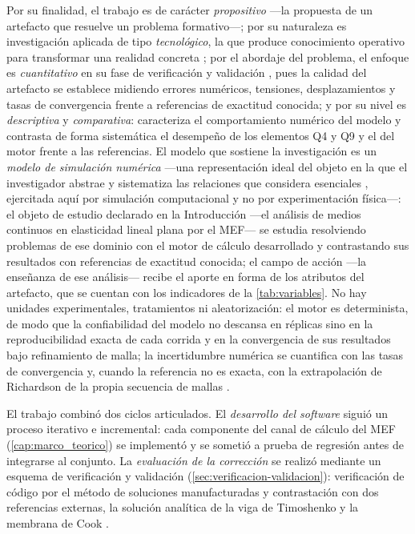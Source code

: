 Por su finalidad, el trabajo es de carácter \emph{propositivo} —la propuesta de un artefacto que resuelve un problema formativo—; por su naturaleza es investigación aplicada de tipo \emph{tecnológico}, la que produce conocimiento operativo para transformar una realidad concreta \autocite[pp.~90-92]{garciacordoba2005tecnologica}; por el abordaje del problema, el enfoque es \emph{cuantitativo} en su fase de verificación y validación \autocite[p.~6]{sampieri2018metodologia}, pues la calidad del artefacto se establece midiendo errores numéricos, tensiones, desplazamientos y tasas de convergencia frente a referencias de exactitud conocida; y por su nivel es \emph{descriptiva} y \emph{comparativa}: caracteriza el comportamiento numérico del modelo y contrasta de forma sistemática el desempeño de los elementos Q4 y Q9 y el del motor frente a las referencias. El modelo que sostiene la investigación es un \emph{modelo de simulación numérica} —una representación ideal del objeto en la que el investigador abstrae y sistematiza las relaciones que considera esenciales \autocite[p.~21]{alvarez_metodologia}, ejercitada aquí por simulación computacional y no por experimentación física—: el objeto de estudio declarado en la Introducción —el análisis de medios continuos en elasticidad lineal plana por el MEF— se estudia resolviendo problemas de ese dominio con el motor de cálculo desarrollado y contrastando sus resultados con referencias de exactitud conocida; el campo de acción —la enseñanza de ese análisis— recibe el aporte en forma de los atributos del artefacto, que se cuentan con los indicadores de la \autoref{tab:variables}. No hay unidades experimentales, tratamientos ni aleatorización: el motor es determinista, de modo que la confiabilidad del modelo no descansa en réplicas sino en la reproducibilidad exacta de cada corrida y en la convergencia de sus resultados bajo refinamiento de malla; la incertidumbre numérica se cuantifica con las tasas de convergencia y, cuando la referencia no es exacta, con la extrapolación de Richardson de la propia secuencia de mallas \autocite[pp.~309-312]{oberkampf2010vv}.

El trabajo combinó dos ciclos articulados. El \emph{desarrollo del software} siguió un proceso iterativo e incremental: cada componente del canal de cálculo del MEF (\autoref{cap:marco_teorico}) se implementó y se sometió a prueba de regresión antes de integrarse al conjunto. La \emph{evaluación de la corrección} se realizó mediante un esquema de verificación y validación (\autoref{sec:verificacion-validacion}): verificación de código por el método de soluciones manufacturadas y contrastación con dos referencias externas, la solución analítica de la viga de Timoshenko y la membrana de Cook \autocite{oberkampf2010vv,salari2000mms}.

